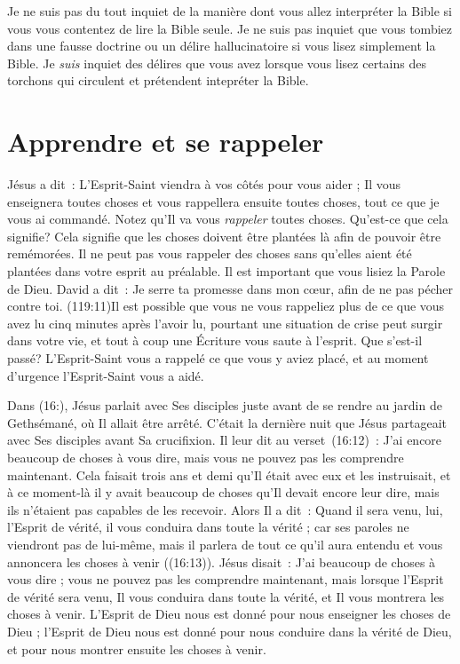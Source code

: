 Je ne suis pas du tout inquiet de la manière dont vous allez interpréter
 la Bible si vous vous contentez de lire la Bible seule.
 Je ne suis pas inquiet que vous tombiez dans une fausse doctrine
 ou un délire hallucinatoire si vous lisez simplement la Bible.
 Je \emph{suis} inquiet des délires que vous avez lorsque vous lisez certains
 des torchons qui circulent et prétendent intepréter la Bible.


\section{Apprendre et se rappeler}

Jésus a dit~: \Og L'Esprit-Saint viendra à vos côtés pour vous aider ;
 Il vous enseignera toutes choses et vous rappellera ensuite toutes choses,
 tout ce que je vous ai commandé. \Fg{}
 Notez qu'Il va vous \emph{rappeler} toutes choses.
 Qu'est-ce que cela signifie? Cela signifie que les choses
 doivent être plantées là afin de pouvoir être remémorées.
 Il ne peut pas vous rappeler des choses sans qu'elles aient été plantées
 dans votre esprit au préalable. Il est important que vous lisiez
 la Parole de Dieu. David a dit~: \Og Je serre ta promesse dans mon cœur,
 afin de ne pas pécher contre toi. \Fg{}
 (119:11)Il est possible que vous ne vous rappeliez
 plus de ce que vous avez lu
 cinq minutes après l'avoir lu, pourtant une situation de crise
 peut surgir dans votre vie, et tout à coup une Écriture vous saute
 à l'esprit. Que s'est-il passé? L'Esprit-Saint vous a rappelé
 ce que vous y aviez placé, et au moment d'urgence l'Esprit-Saint
 vous a aidé.

Dans (16:), Jésus parlait avec Ses disciples juste avant
 de se rendre au jardin de Gethsémané, où Il allait être arrêté.
 C'était la dernière nuit que Jésus partageait avec Ses disciples
 avant Sa crucifixion.
 Il leur dit au verset~(16:12)~:
 \Og J'ai encore beaucoup de choses à vous dire,
 mais vous ne pouvez pas les comprendre maintenant. \Fg{}
 Cela faisait trois ans et demi qu'Il était avec eux et les instruisait,
 et à ce moment-là il y avait beaucoup de choses qu'Il devait encore
 leur dire, mais ils n'étaient pas capables de les recevoir.
 Alors Il a dit~: \Og Quand il sera venu, lui, l'Esprit de vérité,
 il vous conduira dans toute la vérité ; car ses paroles ne viendront pas
 de lui-même, mais il parlera de tout ce qu'il aura entendu et vous annoncera
 les choses à venir \Fg{} ((16:13)).
 Jésus disait~: \Og J'ai beaucoup de choses à vous dire ; vous ne pouvez pas
 les comprendre maintenant, mais lorsque l'Esprit de vérité sera venu,
 Il vous conduira dans toute la vérité, et Il vous montrera les choses
 à venir. \Fg{}
 L'Esprit de Dieu nous est donné pour nous enseigner les choses de Dieu ;
 l'Esprit de Dieu nous est donné pour nous conduire dans la vérité de Dieu,
 et pour nous montrer ensuite les choses à venir.


